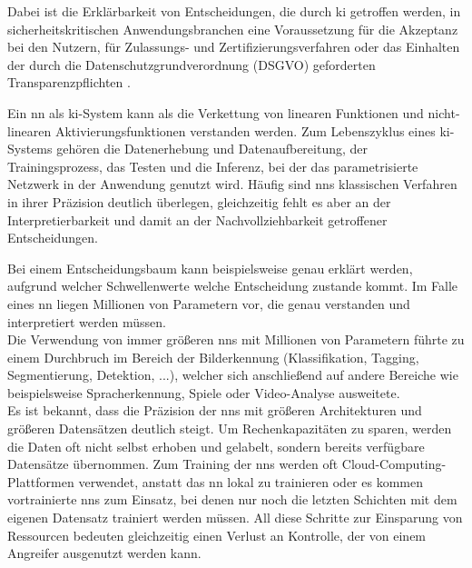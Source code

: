 \documentclass[twoside, 12pt,a4paper]{book}
\numberwithin{equation}{section}
\begin{document}
	
	\noindent Dabei ist die Erklärbarkeit von Entscheidungen, die durch \ac{ki} getroffen werden, in
	sicherheitskritischen Anwendungsbranchen eine Voraussetzung für die Akzeptanz bei den Nutzern, für
	Zulassungs- und Zertifizierungsverfahren oder das Einhalten der durch die Datenschutzgrundverordnung (DSGVO) geforderten
	Transparenzpflichten \cite{kistudie}.
	
	\noindent Ein \ac{nn} als \ac{ki}-System kann als die Verkettung von linearen Funktionen und nicht-linearen Aktivierungsfunktionen verstanden werden.
	Zum Lebenszyklus eines \ac{ki}-Systems gehören die Datenerhebung und Datenaufbereitung, der Trainingsprozess, das Testen und die Inferenz, bei der das parametrisierte Netzwerk in der Anwendung genutzt wird. Häufig sind \acp{nn} klassischen Verfahren in ihrer Präzision deutlich überlegen, gleichzeitig fehlt es aber an der Interpretierbarkeit und damit an der Nachvollziehbarkeit getroffener Entscheidungen.
	
	\noindent Bei einem Entscheidungsbaum kann beispielsweise genau erklärt werden, aufgrund welcher Schwellenwerte welche Entscheidung zustande kommt. 
	Im Falle eines \ac{nn} liegen Millionen von Parametern vor, die genau verstanden und interpretiert werden müssen. \\
	
	\noindent Die Verwendung von immer größeren \acp{nn} mit Millionen von Parametern führte zu einem Durchbruch im Bereich der Bilderkennung (Klassifikation, Tagging, Segmentierung, Detektion, ...), welcher sich anschließend auf andere Bereiche wie beispielsweise Spracherkennung, Spiele oder Video-Analyse ausweitete.\\
	
	
	\noindent Es ist bekannt, dass die Präzision der \acp{nn} mit größeren Architekturen und größeren Datensätzen deutlich steigt. Um Rechenkapazitäten zu sparen, werden die Daten oft nicht selbst erhoben und gelabelt, sondern bereits verfügbare Datensätze übernommen. Zum Training der \acp{nn} werden oft Cloud-Computing-Plattformen verwendet, anstatt das \ac{nn} lokal zu trainieren oder es kommen vortrainierte \acp{nn} zum Einsatz, bei denen nur noch die letzten Schichten mit dem eigenen Datensatz trainiert werden müssen. All diese Schritte zur Einsparung von Ressourcen bedeuten gleichzeitig einen Verlust an Kontrolle, der von einem Angreifer ausgenutzt werden kann.\\
	
\end{document}
